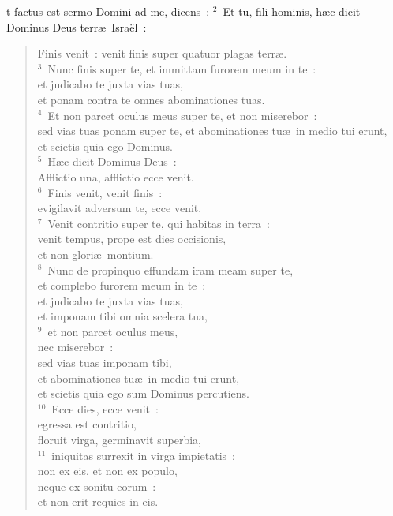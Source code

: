 \bchapter
{}t factus est sermo Domini ad me, dicens~:
${}^{2}$~Et tu, fili hominis, h\ae c dicit Dominus Deus terr\ae\ Isra\"el~: \begin{flushleft}\begin{verse}Finis venit~: venit finis super quatuor plagas terr\ae .\\
${}^{3}$~Nunc finis super te, et immittam furorem meum in te~:\\ et judicabo te juxta vias tuas,\\ et ponam contra te omnes abominationes tuas.\\
${}^{4}$~Et non parcet oculus meus super te, et non miserebor~:\\ sed vias tuas ponam super te, et abominationes tu\ae\ in medio tui erunt,\\ et scietis quia ego Dominus.\\
${}^{5}$~H\ae c dicit Dominus Deus~:\\ Afflictio una, afflictio ecce venit.\\
${}^{6}$~Finis venit, venit finis~:\\ evigilavit adversum te, ecce venit.\\
${}^{7}$~Venit contritio super te, qui habitas in terra~:\\ venit tempus, prope est dies occisionis,\\ et non glori\ae\ montium.\\
${}^{8}$~Nunc de propinquo effundam iram meam super te,\\ et complebo furorem meum in te~:\\ et judicabo te juxta vias tuas,\\ et imponam tibi omnia scelera tua,\\
${}^{9}$~et non parcet oculus meus,\\ nec miserebor~:\\ sed vias tuas imponam tibi,\\ et abominationes tu\ae\ in medio tui erunt,\\ et scietis quia ego sum Dominus percutiens.\\
${}^{10}$~Ecce dies, ecce venit~:\\ egressa est contritio,\\ floruit virga, germinavit superbia,\\
${}^{11}$~iniquitas surrexit in virga impietatis~:\\ non ex eis, et non ex populo,\\ neque ex sonitu eorum~:\\ et non erit requies in eis.\\

\end{verse}
\end{flushleft}
